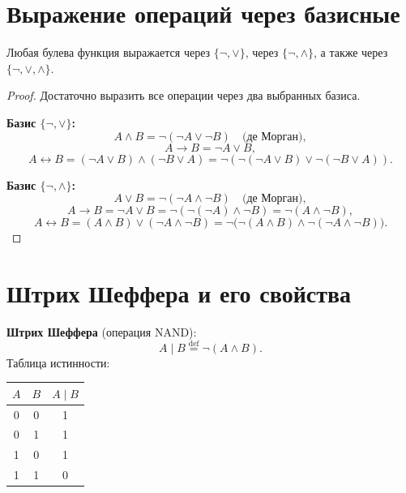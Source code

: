 \documentclass[12pt]{article}
\begin{document}
\section{Выражение операций через базисные}

\begin{theorem}
Любая булева функция выражается через $\{\neg, \vee\}$,
через $\{\neg, \wedge\}$, а также через $\{\neg, \vee, \wedge\}$.
\end{theorem}

\begin{proof}
Достаточно выразить все операции через два выбранных базиса.

\medskip
\textbf{Базис $\{\neg, \vee\}$:}
\[
A \wedge B = \neg(\neg A \vee \neg B)
\quad\text{(де Морган)},
\]
\[
A \to B = \neg A \vee B,
\]
\[
A \leftrightarrow B = (\neg A \vee B) \wedge (\neg B \vee A)
= \neg(\neg(\neg A \vee B) \vee \neg(\neg B \vee A)).
\]

\medskip
\textbf{Базис $\{\neg, \wedge\}$:}
\[
A \vee B = \neg(\neg A \wedge \neg B)
\quad\text{(де Морган)},
\]
\[
A \to B = \neg A \vee B = \neg(\neg(\neg A) \wedge \neg B)
= \neg(A \wedge \neg B),
\]
\[
A \leftrightarrow B = (A \wedge B) \vee (\neg A \wedge \neg B)
= \neg\!\bigl(\neg(A \wedge B) \wedge \neg(\neg A \wedge \neg B)\bigr).
\]
\end{proof}

\section{Штрих Шеффера и его свойства}

\begin{definition}
\textbf{Штрих Шеффера} (операция NAND):
\[
A \mid B \stackrel{\mathrm{def}}{=} \neg(A \wedge B).
\]
Таблица истинности:
\begin{center}
\begin{tabular}{|c|c|c|}
\hline
$A$ & $B$ & $A \mid B$ \\ \hline
0 & 0 & 1 \\
0 & 1 & 1 \\
1 & 0 & 1 \\
1 & 1 & 0 \\ \hline
\end{tabular}
\end{center}
\end{definition}
\end{document}
